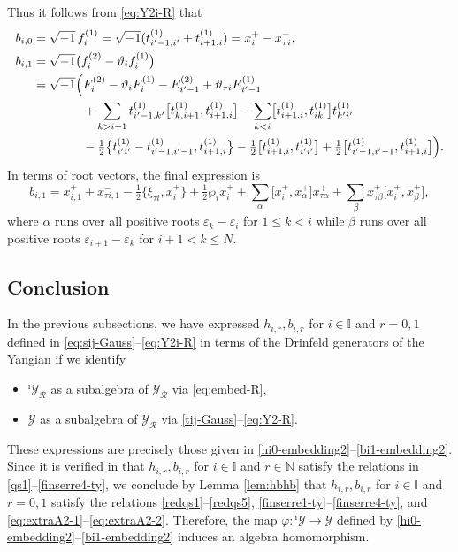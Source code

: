 \documentclass[11pt,reqno]{amsart}
\numberwithin{equation}{section}
\theoremstyle{definition}
\theoremstyle{remark}
\newcommand{\bN}{\mathbb{N}}
\newcommand{\hf}{\tfrac12}
\newcommand{\lle}{\leqslant}
\newcommand{\I}{{\mathbb I}}
\newcommand{\ve}{\varepsilon}
\newcommand{\Y}{{\mathscr{Y}}}
\newcommand{\Yi}{{^\imath\mathscr{Y}}}
\newcommand{\imag}{\sqrt{-1}}
\newcommand{\comm}[2]{\bigl[#1,#2\bigr]}
\newcommand{\acomm}[2]{\bigl\{#1,#2\bigr\}}
\begin{document}
Thus it follows from \eqref{eq:Y2i-R} that
\begin{align*}
b_{i,0}&=\imag\,f_i^{(1)}=\imag(t_{i'-1,i'}^{(1)}+t_{i+1,i}^{(1)})=x_i^+-x_{\tau i}^-,\\
  b_{i,1}&=\imag\big(f_i^{(2)}-
       \vartheta_if_i^{(1)}\big)\\
  &=\imag\Big(
      F_i^{(2)}-\vartheta_iF_i^{(1)}-E_{i'-1}^{(2)}+\vartheta_{\tau i}E_{i'-1}^{(1)}     
      \notag\\
  &\hspace{4em}
      +\sum_{k>i+1}t_{i'-1,k'}^{(1)}
        \comm{t_{k,i+1}^{(1)}}{t_{i+1,i}^{(1)}}-\sum_{k<i}\comm{t_{i+1,i}^{(1)}}{t_{ik}^{(1)}}t_{k'i'}^{(1)}\\
  &\hspace{4em}-\tfrac12\acomm{t_{i'i'}^{(1)}-t_{i'-1,i'-1}^{(1)}}{t_{i+1,i}^{(1)}}
      -\tfrac12\comm{t_{i+1,i}^{(1)}}{t_{i'i'}^{(1)}}
      +\tfrac12\comm{t_{i'-1,i'-1}^{(1)}}{t_{i+1,i}^{(1)}}
      \Big).
\end{align*}
In terms of root vectors, the final expression is
\begin{equation*}
b_{i,1}
   =x_{i,1}^{+}+x_{\tau i,1}^{-}
    -\tfrac12\acomm{\xi_{\tau i}}{x_i^{+}}+\hf\wp_i x_i^++\sum_{\alpha}
       \comm{x_i^{+}}{x_{\alpha}^{+}}x_{\tau\alpha}^{+}
    +\sum_{\beta}
       x_{\tau\beta}^{+}\comm{x_i^{+}}{x_{\beta}^{+}},
\end{equation*}
where $\alpha$ runs over all positive roots $\ve_k-\ve_i$ for $1\lle k<i$ while $\beta$ runs over all positive roots $\ve_{i+1}-\ve_k$ for $i+1<k\lle N$.

\subsection{Conclusion}
In the previous subsections, we have expressed $h_{i,r},b_{i,r}$ for $i\in \I$ and $r=0,1$ defined in \eqref{eq:sij-Gauss}--\eqref{eq:Y2i-R} in terms of the Drinfeld generators of the Yangian if we identify
\begin{itemize}
    \item $\Yi_{\mathscr R}$ as a subalgebra of $\Y_{\mathscr R}$ via \eqref{eq:embed-R},
    \item $\Y$ as a subalgebra of $\Y_{\mathscr R}$ via \eqref{tij-Gauss}--\eqref{eq:Y2-R}.
\end{itemize}
These expressions are precisely those given in \eqref{hi0-embedding2}--\eqref{bi1-embedding2}. Since it is verified in \cite{LZ24} that $h_{i,r},b_{i,r}$ for $i\in \I$ and $r\in \bN$ satisfy the relations in \eqref{qs1}--\eqref{finserre4-ty}, we conclude by Lemma \ref{lem:hbhb} that $h_{i,r},b_{i,r}$ for $i\in \I$ and $r=0,1$  satisfy the relations \eqref{redqs1}--\eqref{redqs5}, \eqref{finserre1-ty}--\eqref{finserre4-ty}, and \eqref{eq:extraA2-1}--\eqref{eq:extraA2-2}. Therefore, the map $\varphi:\Yi\to \Y$ defined by \eqref{hi0-embedding2}--\eqref{bi1-embedding2} induces an algebra homomorphism.






\end{document}
